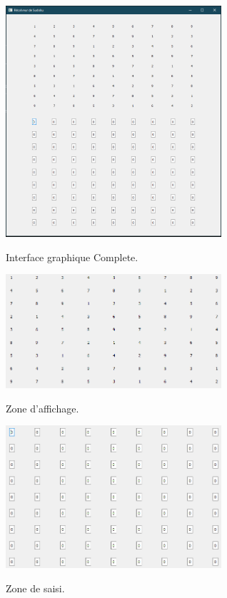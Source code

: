 \begin{figure}[h]
  \begin{center}
\includegraphics[width=8cm]{./images/Interface_Complete.png}\label{Interface_complete}
\caption{Interface graphique Complete.}
\end{center}
\end{figure}


\begin{figure}[h]
  \begin{center}
\includegraphics[width=8cm]{./images/Interface_Affichage.png}\label{Interface_affichage}
\caption{Zone d'affichage.}
\end{center}
\end{figure}


\begin{figure}[h]
  \begin{center}
\includegraphics[width=8cm]{./images/Interface_saisi.png}\label{Interface_saisi}
\caption{Zone de saisi.}
\end{center}
\end{figure}


